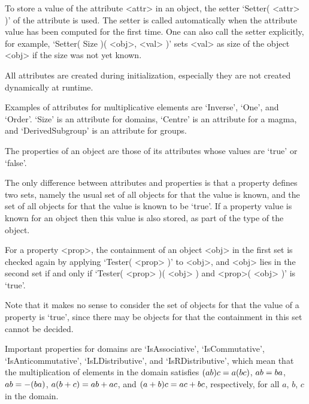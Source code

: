 
To store a value of the attribute <attr> in an object,
the setter `Setter( <attr> )' of the attribute is used.
The setter is called automatically when the attribute value has been
computed for the first time.
One can also call the setter explicitly,
for example, `Setter( Size )( <obj>, <val> )' sets <val> as size of the
object <obj> if the size was not yet known.

All attributes are created during initialization,
especially they are not created dynamically at runtime.

Examples of attributes for multiplicative elements are `Inverse', `One',
and `Order'.
`Size' is an attribute for domains, `Centre' is an attribute for a magma,
and `DerivedSubgroup' is an attribute for groups.


The properties of an object are those of its attributes whose values are
`true' or `false'.

The only difference between attributes and properties is that a property
defines two sets,
namely the usual set of all objects for that the value is known,
and the set of all objects for that the value is known to be `true'.
If a property value is known for an object then this value is also 
stored, as part of the type of the object.

For a property <prop>, the containment of an object <obj> in the first
set is checked again by applying `Tester( <prop> )' to <obj>,
and <obj> lies in the second set if and only if
`Tester( <prop> )( <obj> ) and <prop>( <obj> )' is `true'.

Note that it makes no sense to consider the set of objects for that the
value of a property is `true', since there may be objects for that the
containment in this set cannot be decided.

Important properties for domains are `IsAssociative', `IsCommutative',
`IsAnticommutative', `IsLDistributive', and `IsRDistributive',
which mean that the multiplication of elements in the domain satisfies
$(a \* b ) \* c = a \* ( b \* c )$, $a \* b = b \* a$,
$a \* b = - ( b \* a )$, $a \* ( b + c ) = a \* b + a \* c$,
and $( a + b ) \* c = a \* c + b \* c$, respectively,
for all $a$, $b$, $c$ in the domain.


